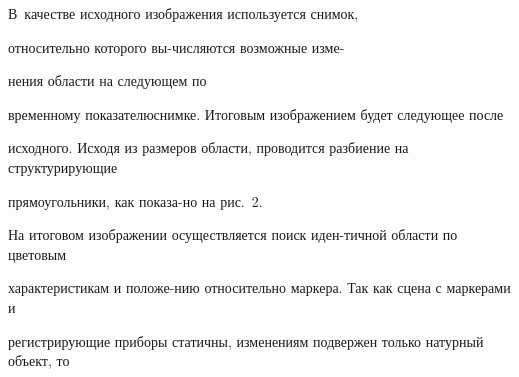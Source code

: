 




\noindent


 В~качестве исходного изоб\-ра\-же\-ния используется снимок,\linebreak


от\-но\-си\-тель\-но которого вы-\linebreak чис\-ля\-ют\-ся возможные изме-\linebreak


нения об\-ласти на сле\-ду\-ющем по 


временному показателю\linebreak сним\-ке. Итоговым изобра\-же\-ни\-ем будет следующее после 


исходного. Исходя из размеров области, проводится разбиение на структурирующие 


прямоугольники, как показа-\linebreak но на рис.~2.





      


На итоговом изображении осуществляется поиск иден-\linebreak тичной области по цветовым 


характеристикам и положе-\linebreak нию относительно маркера. Так как сцена с маркерами и 


ре\-гист\-ри\-ру\-ющие приборы статичны, изменениям подвержен только натурный объект, то 


